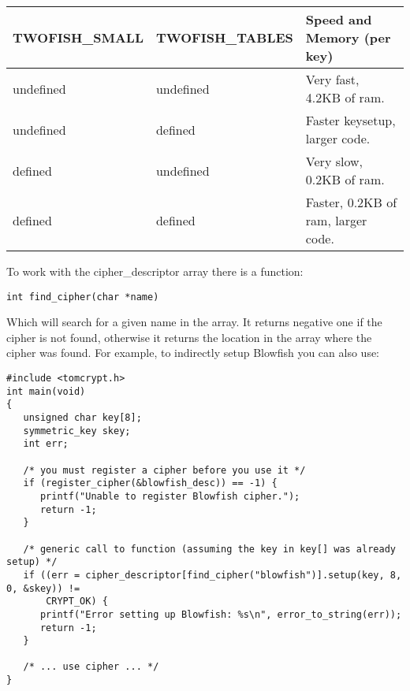 \documentclass[a4paper]{book}
\begin{document}
\begin{small}
\begin{enumerate}
\begin{small}
\begin{center}
\begin{tabular}{|l|l|l|}
\hline TWOFISH\_SMALL & TWOFISH\_TABLES & Speed and Memory (per key) \\
\hline undefined & undefined & Very fast, 4.2KB of ram. \\
\hline undefined & defined & Faster keysetup, larger code. \\
\hline defined & undefined & Very slow, 0.2KB of ram. \\
\hline defined & defined & Faster, 0.2KB of ram, larger code. \\
\hline
\end{tabular}
\end{center}
\end{small}

\end{enumerate}
\end{small}

To work with the cipher\_descriptor array there is a function:
\begin{verbatim}
int find_cipher(char *name)
\end{verbatim}
Which will search for a given name in the array.  It returns negative one if the cipher is not found, otherwise it returns
the location in the array where the cipher was found.  For example, to indirectly setup Blowfish you can also use:
\begin{small}
\begin{verbatim}
#include <tomcrypt.h>
int main(void)
{
   unsigned char key[8];
   symmetric_key skey;
   int err;

   /* you must register a cipher before you use it */
   if (register_cipher(&blowfish_desc)) == -1) {
      printf("Unable to register Blowfish cipher.");
      return -1;
   }

   /* generic call to function (assuming the key in key[] was already setup) */
   if ((err = cipher_descriptor[find_cipher("blowfish")].setup(key, 8, 0, &skey)) != 
       CRYPT_OK) {
      printf("Error setting up Blowfish: %s\n", error_to_string(err));
      return -1;
   }

   /* ... use cipher ... */
}
\end{verbatim}
\end{small}
\end{document}

